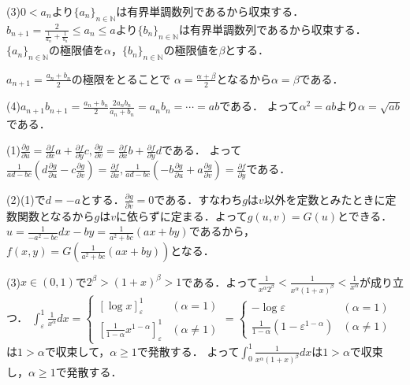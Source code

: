 \documentclass[
		book,
		head_space=20mm,
		foot_space=20mm,
		gutter=10mm,
		line_length=190mm
]{jlreq}
\begin{document}
(3)$0<a_n$より$\{a_n\}_{n\in \mathbb{N}}$は有界単調数列であるから収束する．
$b_{n+1}=\frac{2}{\frac{1}{a_n}+\frac{1}{b_n}}\le a_n\le a$より$\{b_n\}_{n\in \mathbb{N}}$は有界単調数列であるから収束する．
$\{a_n\}_{n\in \mathbb{N}}$の極限値を$\alpha$，$\{b_n\}_{n\in \mathbb{N}}$の極限値を$\beta$とする．

$a_{n+1}=\frac{a_n+b_n}{2}$の極限をとることで
$\alpha=\frac{\alpha+\beta}{2}$となるから$\alpha=\beta$である．

(4)$a_{n+1}b_{n+1}=\frac{a_n+b_n}{2}\frac{2a_nb_n}{a_n+b_n}=a_nb_n=\cdots=ab$である．
よって$\alpha^2=ab$より$\alpha=\sqrt{ab}$である．

(1)$\frac{\partial g}{\partial u}=\frac{\partial f}{\partial x}a+\frac{\partial f}{\partial y}c,\frac{\partial g}{\partial v}=\frac{\partial f}{\partial x}b+\frac{\partial f}{\partial y}d$である．
よって$\frac{1}{ad-bc} \left(d\frac{\partial g}{\partial u}-c\frac{\partial g}{\partial v}\right)=\frac{\partial f}{\partial x},\frac{1}{ad-bc} \left(-b\frac{\partial g}{\partial u}+a\frac{\partial g}{\partial v}\right)=\frac{\partial f}{\partial y}$である．

(2)(1)で$d=-a$とする．$\frac{\partial g}{\partial v}=0$である．すなわち$g$は$v$以外を定数とみたときに定数関数となるから$g$は$v$に依らずに定まる．よって$g(u,v)=G(u)$とできる．$u=\frac{1}{-a^2-bc}dx-by=\frac{1}{a^2+bc}(ax+by)$であるから，
$f(x,y)=G(\frac{1}{a^2+bc}(ax+by))$となる．

(3)$x\in(0,1)$で$2^\beta>(1+x)^\beta>1$である．よって$\frac{1}{x^\alpha 2^\beta}<\frac{1}{x^\alpha(1+x)^\beta}<\frac{1}{x^\alpha}$が成り立つ．
$\int_\varepsilon^1 \frac{1}{x^\alpha}dx=\begin{cases}
	[\log x]_\varepsilon^1& (\alpha=1)\\
	[\frac{1}{1-\alpha}x^{1-\alpha}]_\varepsilon^1&(\alpha\neq 1)
\end{cases}=\begin{cases}
	-\log \varepsilon& (\alpha=1)\\
	\frac{1}{1-\alpha}(1-\varepsilon^{1-\alpha})&(\alpha\neq 1)
\end{cases}
$は$1>\alpha$で収束して，$\alpha\ge 1$で発散する．
よって$\int_0^1\frac{1}{x^\alpha(1+x)^\beta}dx$は$1>\alpha$で収束し，$\alpha\ge 1$で発散する．
\end{document}
